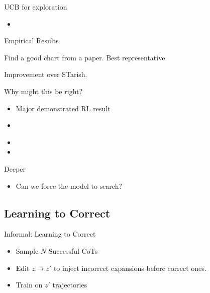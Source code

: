 \documentclass[14pt,aspectratio=169]{beamer}
\begin{document}
\begin{frame}{UCB for exploration}
	\begin{itemize}
		\item
	\end{itemize}
\end{frame}


\begin{frame}{Empirical Results}

	Find a good chart from a paper.
	Best representative.

	Improvement over STarish.
\end{frame}


\begin{frame}{Why might this be right?}
	\begin{itemize}
		\item Major demonstrated RL result
		\item
	\end{itemize}
	\begin{itemize}
		\item
		\item
	\end{itemize}
\end{frame}


\begin{frame}{Deeper}
	\begin{itemize}
		\item Can we force the model to search?
	\end{itemize}
\end{frame}

\subsection{Learning to Correct}

\begin{frame}{Informal: Learning to Correct}
	\begin{itemize}
		\item Sample $N$ Successful CoTs
		\item Edit $z\rightarrow z'$ to inject incorrect expansions before
		      correct ones.
		\item Train on $z'$ trajectories
	\end{itemize}
\end{frame}
\end{document}
